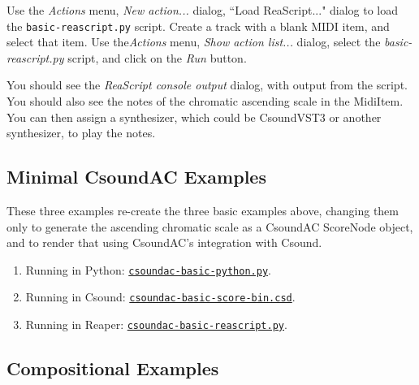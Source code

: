 \documentclass[letterpaper,10pt,DIV=12,parskip=half]{scrartcl}
\begin{document}
Use the \emph{Actions} menu, \emph{New action...} dialog, ``Load ReaScript..." dialog to load the \lstinline|basic-reascript.py| script. Create a track with a blank MIDI item, and select that item. Use the\emph{Actions} menu, \emph{Show action list...} dialog, select the \emph{basic-reascript.py} script, and click on the \emph{Run} button. 

You should see the \emph{ReaScript console output} dialog, with output from the script. You should also see the notes of the chromatic ascending scale in the MidiItem. You can then assign a synthesizer, which could be CsoundVST3 or another synthesizer, to play the notes.

\subsection{Minimal CsoundAC Examples}

These three examples re-create the three basic examples above, changing them only to generate the ascending chromatic scale as a CsoundAC ScoreNode object, and to render that using CsoundAC's integration with Csound.

\begin{enumerate}

\item Running in Python: \href{https://github.com/gogins/csound-ac/blob/master/user-guide/csoundac-basic-python.py}{\lstinline|csoundac-basic-python.py|}.

\item Running in Csound: \href{https://github.com/gogins/csound-ac/blob/master/user-guide/csoundac-basic-score-bin.csd}{\lstinline|csoundac-basic-score-bin.csd|}.

\item Running in Reaper: \href{https://github.com/gogins/csound-ac/blob/master/user-guide/csoundac-basic-reascript.py}{\lstinline|csoundac-basic-reascript.py|}.

\end{enumerate}

\subsection{Compositional Examples}
\end{document}
